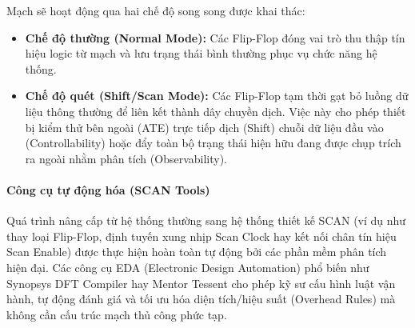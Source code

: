 Mạch sẽ hoạt động qua hai chế độ song song được khai thác:
\begin{itemize}
    \item \textbf{Chế độ thường (Normal Mode):} Các Flip-Flop đóng vai trò thu thập tín hiệu logic từ mạch và lưu trạng thái bình thường phục vụ chức năng hệ thống.
    \item \textbf{Chế độ quét (Shift/Scan Mode):} Các Flip-Flop tạm thời gạt bỏ luồng dữ liệu thông thường để liên kết thành dây chuyền dịch. Việc này cho phép thiết bị kiểm thử bên ngoài (ATE) trực tiếp dịch (Shift) chuỗi dữ liệu đầu vào (Controllability) hoặc đẩy toàn bộ trạng thái hiện hữu đang được chụp trích ra ngoài nhằm phân tích (Observability).
\end{itemize}

\paragraph{Công cụ tự động hóa (SCAN Tools)}
Quá trình nâng cấp từ hệ thống thường sang hệ thống thiết kế SCAN (ví dụ như thay loại Flip-Flop, định tuyến xung nhịp Scan Clock hay kết nối chân tín hiệu Scan Enable) được thực hiện hoàn toàn tự động bởi các phần mềm phân tích hiện đại. Các công cụ EDA (Electronic Design Automation) phổ biến như Synopsys DFT Compiler hay Mentor Tessent cho phép kỹ sư cấu hình luật vận hành, tự động đánh giá và tối ưu hóa diện tích/hiệu suất (Overhead Rules) mà không cần cấu trúc mạch thủ công phức tạp.
